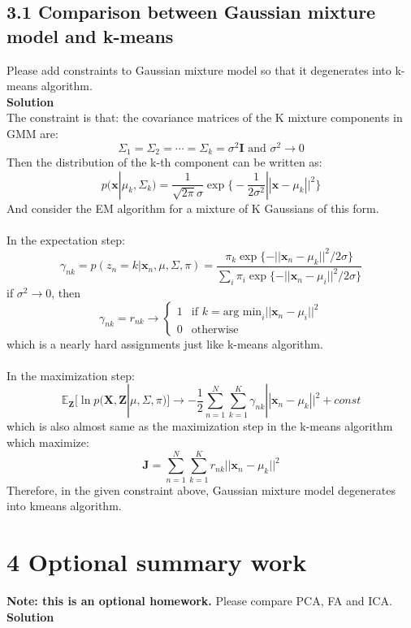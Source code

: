 \documentclass[20pt]{article}
\newcommand{\solution}{\textbf{\normalsize Solution}}
\newcommand{\I}{\mathbf{I}}
\newcommand{\x}{\mathbf{x}}
\begin{document}
 \subsection*{3.1 Comparison between Gaussian mixture model and k-means}
 {\color{blue} Please add constraints to Gaussian mixture model so that it degenerates into k-means algorithm.
 } \\
 \solution \\
 The constraint is that: the covariance matrices of the K mixture components in GMM are:
 $$\Sigma_1 = \Sigma_2 = \cdots = \Sigma_k = \sigma^2\I\text{ and } \sigma^2\rightarrow 0$$
 Then the distribution of the k-th component can be written as:
 $$p(\x|\mu_k,\Sigma_k) = \frac{1}{\sqrt{2\pi}\sigma} \exp \big\{-\frac{1}{2\sigma^2} ||\x-\mu_k||^2\big\}$$
 And consider the EM algorithm for a mixture of K Gaussians of this form.\\
 \\
 In the expectation step:
 $$\gamma_{nk} = p(z_n=k|\x_n,\mu,\Sigma,\pi) = \frac{\pi_k\exp\{-||\x_n-\mu_k||^2/2\sigma\}}{\sum_i \pi_i \exp\{-||\x_n-\mu_i||^2/2\sigma\}}$$
 if $\sigma^2\rightarrow 0$, then
 $$\gamma_{nk}=r_{nk} \rightarrow \begin{cases} 1 & \text{if } k=\text{arg min}_i ||\x_n-\mu_i||^2 \\ 0 & \text{otherwise}\end{cases}$$
 which is a nearly hard assignments just like k-means algorithm.\\
 \\
 In the maximization step:
 $$\mathbb{E}_{\mathbf{Z}}[\ln p(\mathbf{X},\mathbf{Z}|\mu,\Sigma,\pi)] \rightarrow -\frac{1}{2}\sum_{n=1}^N \sum_{k=1}^K \gamma_{nk} ||\x_n-\mu_k||^2 + const$$
 which is also almost same as the maximization step in the k-means algorithm which maximize:
 $$\mathbf{J} = \sum_{n=1}^N \sum_{k=1}^K r_{nk}||\x_n-\mu_k||^2$$
 Therefore, in the given constraint above, Gaussian mixture model degenerates into kmeans
 algorithm.

\section*{4 Optional summary work}
 \textbf{Note: this is an optional homework.} Please compare PCA, FA and ICA. \\
 \solution \\
\end{document}
